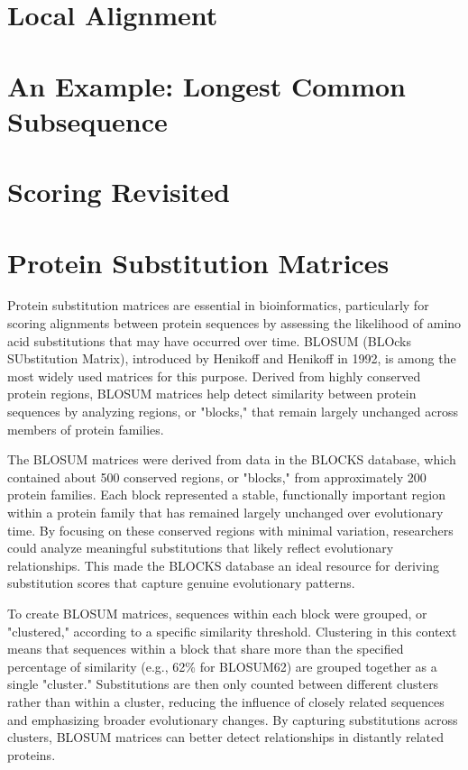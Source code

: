 \section{Local Alignment}

\section{An Example: Longest Common Subsequence}

\section{Scoring Revisited}

\section{Protein Substitution Matrices}

Protein substitution matrices are essential in bioinformatics, particularly for scoring alignments between protein sequences by assessing the likelihood of amino acid substitutions that may have occurred over time. BLOSUM (BLOcks SUbstitution Matrix), introduced by Henikoff and Henikoff in 1992, is among the most widely used matrices for this purpose. Derived from highly conserved protein regions, BLOSUM matrices help detect similarity between protein sequences by analyzing regions, or "blocks," that remain largely unchanged across members of protein families.



The BLOSUM matrices were derived from data in the BLOCKS database, which contained about 500 conserved regions, or "blocks," from approximately 200 protein families.
Each block represented a stable, functionally important region within a protein family that has remained largely unchanged over evolutionary time. By focusing on these conserved regions with minimal variation, researchers could analyze meaningful substitutions that likely reflect evolutionary relationships. This made the BLOCKS database an ideal resource for deriving substitution scores that capture genuine evolutionary patterns.

To create BLOSUM matrices, sequences within each block were grouped, or "clustered," according to a specific similarity threshold. Clustering in this context means that sequences within a block that share more than the specified percentage of similarity (e.g., 62\% for BLOSUM62) are grouped together as a single "cluster." Substitutions are then only counted between different clusters rather than within a cluster, reducing the influence of closely related sequences and emphasizing broader evolutionary changes. By capturing substitutions across clusters, BLOSUM matrices can better detect relationships in distantly related proteins.

